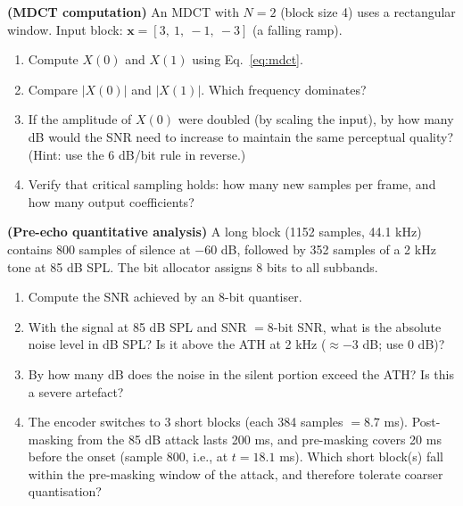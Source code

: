 \begin{exercisebox}
\textbf{(MDCT computation)}
An MDCT with $N = 2$ (block size 4) uses a rectangular window. Input block: $\mathbf{x} = [3,\ 1,\ -1,\ -3]$ (a falling ramp).
\begin{enumerate}[nosep, label=(\alph*)]
  \item Compute $X(0)$ and $X(1)$ using Eq.~\eqref{eq:mdct}.
  \item Compare $|X(0)|$ and $|X(1)|$. Which frequency dominates?
  \item If the amplitude of $X(0)$ were doubled (by scaling the input), by how many dB would the SNR need to increase to maintain the same perceptual quality? (Hint: use the 6 dB/bit rule in reverse.)
  \item Verify that critical sampling holds: how many new samples per frame, and how many output coefficients?
\end{enumerate}
\end{exercisebox}

\begin{exercisebox}
\textbf{(Pre-echo quantitative analysis)}
A long block (1152 samples, 44.1 kHz) contains 800 samples of silence at $-60$ dB, followed by 352 samples of a 2 kHz tone at 85 dB SPL. The bit allocator assigns 8 bits to all subbands.
\begin{enumerate}[nosep, label=(\alph*)]
  \item Compute the SNR achieved by an 8-bit quantiser.
  \item With the signal at 85 dB SPL and SNR $= 8$-bit SNR, what is the absolute noise level in dB SPL? Is it above the ATH at 2 kHz ($\approx -3$ dB; use 0 dB)?
  \item By how many dB does the noise in the silent portion exceed the ATH? Is this a severe artefact?
  \item The encoder switches to 3 short blocks (each 384 samples $= 8.7$ ms). Post-masking from the 85 dB attack lasts 200 ms, and pre-masking covers 20 ms before the onset (sample 800, i.e., at $t = 18.1$ ms). Which short block(s) fall within the pre-masking window of the attack, and therefore tolerate coarser quantisation?
\end{enumerate}
\end{exercisebox}

